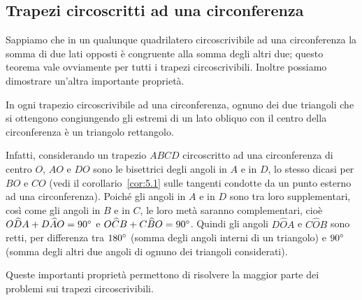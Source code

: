 \setlength{\intextsep}{\defintextsep}
\subsection{Trapezi circoscritti ad una circonferenza}

Sappiamo che in un qualunque quadrilatero circoscrivibile ad una circonferenza la somma di due lati opposti è congruente alla somma degli altri due; questo teorema vale ovviamente per tutti i trapezi circoscrivibili.
Inoltre possiamo dimostrare un'altra importante proprietà.

\begin{proprieta}
In ogni trapezio circoscrivibile ad una circonferenza, ognuno dei due triangoli che si ottengono congiungendo gli estremi di un lato obliquo con il centro della circonferenza è un triangolo rettangolo.
\end{proprieta}

\begin{figure}[htb]
	\centering
\end{figure}
Infatti, considerando un trapezio $ABCD$ circoscritto ad una circonferenza di centro $O$, $AO$ e $DO$ sono le bisettrici degli angoli in $A$ e in $D$, lo stesso dicasi per $BO$ e $CO$ (vedi il corollario~\ref{cor:5.1} sulle tangenti condotte da un punto esterno ad una circonferenza). Poiché gli angoli in $A$ e in $D$ sono tra loro supplementari, così come gli angoli in $B$ e in $C$, le loro metà saranno complementari, cioè $O\widehat{D}A+D\widehat{A}O=90{}^{\circ}$ e $O\widehat{C}B+C\widehat{B}O=90{}^{\circ}$. Quindi gli angoli $D\widehat{O}A$ e $C\widehat{O}B$ sono retti, per differenza tra $180{}^{\circ}$ (somma degli angoli interni di un triangolo) e $90{}^{\circ}$ (somma degli altri due angoli di ognuno dei triangoli considerati).

Queste importanti proprietà permettono di risolvere la maggior parte dei problemi sui trapezi circoscrivibili.

\setlength{\intextsep}{\defintextsep}

